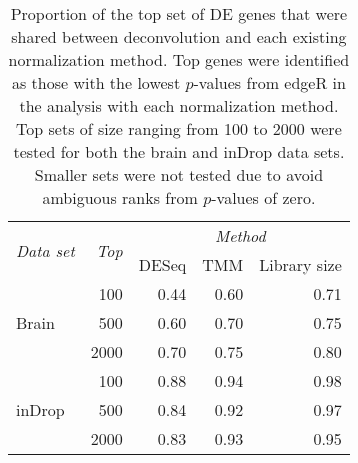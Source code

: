 \documentclass{article}
\begin{document}
\begin{table}[p]
    \caption{
        Proportion of the top set of DE genes that were shared between deconvolution and each existing normalization method.
        Top genes were identified as those with the lowest $p$-values from edgeR in the analysis with each normalization method.
        Top sets of size ranging from 100 to 2000 were tested for both the brain and inDrop data sets.
        Smaller sets were not tested due to avoid ambiguous ranks from $p$-values of zero.
    }
    \begin{center}
        \begin{tabular}{l r r r r}
            \hline
            \multirow{2}{*}{\textit{Data set}} & \multirow{2}{*}{\textit{Top}} & \multicolumn{3}{c}{\textit{Method}} \\
                \cline{3-5}
                & & DESeq & TMM & Library size \\
            \hline
            \multirow{3}{*}{Brain}            
            & 100  & 0.44 & 0.60 & 0.71 \\ 
            & 500  & 0.60 & 0.70 & 0.75 \\
            & 2000 & 0.70 & 0.75 & 0.80 \\
            \hline
            \multirow{3}{*}{inDrop}            
            & 100  & 0.88 & 0.94 & 0.98 \\ 
            & 500  & 0.84 & 0.92 & 0.97 \\
            & 2000 & 0.83 & 0.93 & 0.95 \\
            \hline
        \end{tabular}
    \end{center}
\end{table}
\end{document}

